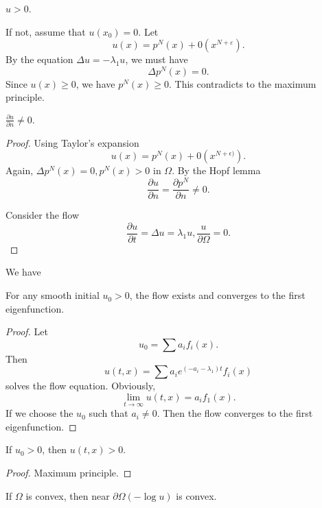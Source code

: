 \begin{lemma} $ u > 0 $.\end{lemma}

If not, assume that $ u (x_0) = 0 $. Let 
%
\[ u(x) = p^N (x) + 0 ( x ^{N+\varepsilon} ). \]
%
By the equation $ \Delta u = - \lambda_1 u $, we must have 
%
\[ \Delta p^N (x) = 0 .\]
%
Since $ u (x) \geq 0 $, we have $ p^N (x) \geq 0 $. This contradicts to the maximum principle.

\begin{lemma} 
$ \frac{\partial u}{\partial n} \neq 0. $
\end{lemma}

\begin{proof}
   Using Taylor's expansion
\[ u(x) = p ^N (x) + 0 ( x ^{N+ \epsilon)} ).\]
%
Again, $ \Delta p^N (x) = 0 , p^N (x) > 0 $ in $ \Omega $. By the Hopf lemma 
%
\[ \frac{\partial u}{\partial n} = \frac{\partial p^N}{\partial n} \neq 0. \]

Consider the flow 
%
\[ \frac{\partial u}{\partial t} = \Delta u = \lambda _1 u, \frac{u}{\partial \Omega} = 0 .\]
\end{proof}
We have 
\begin{lemma} 
For any smooth initial $ u _0 > 0 $, the flow exists and converges to the first eigenfunction. 
\end{lemma}

\begin{proof}
Let 
%
\[ u_0 = \sum a _i f _i (x).\]
%
Then
%
\[ u ( t, x) = \sum a_i e ^{(-a_{i} -  \lambda _{1} )t} f_i (x) \]
%
solves the flow equation. Obviously,
%
\[ \lim_{t \rightarrow  \infty} u(t, x) =  a _i f_1 (x). \]
%
If  we choose the $u_0$ such that $ a _i \neq 0 $. Then the flow converges to the first eigenfunction.
\end{proof}

\begin{lemma} If $ u_0 > 0 $, then $ u (t, x) >0 $.
\end{lemma}

\begin{proof} Maximum principle.
\end{proof}

\begin{lemma} If $ \Omega$ is convex, then near $ \partial \Omega  (-\log u) $ is convex.
\end{lemma}

